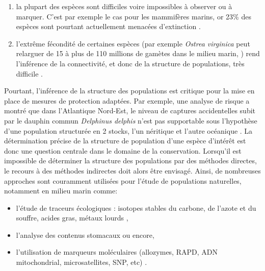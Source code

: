 \documentclass[a4paper,12pt,twoside]{article}\usepackage[]{graphicx}\usepackage[]{color}
\begin{document}
\begin {bibunit} [newbst]
\begin{enumerate}
	\item la plupart des espèces sont difficiles voire impossibles à observer ou à marquer. C'est par exemple le cas pour les mammifères marins, or 23\% des espèces sont pourtant actuellement menacées d'extinction \citep{schipper2008status}.
	\item l'extrême fécondité de certaines espèces (par exemple \emph{Ostrea virginica} peut relarguer de 15 à plus de 110 millions de gamètes dans le milieu marin, \citealp{galtsoff1930fecundity}) rend l'inférence de la connectivité, et donc de la structure de populations, très difficile \citep{gagnaire2015aa}.
\end{enumerate}

Pourtant, l'inférence de la structure des populations est critique pour la mise en place de mesures de protection adaptées. Par exemple, une analyse de risque a montré que dans l'Atlantique Nord-Est, le niveau de captures accidentelles subit par le dauphin commun \emph{Delphinus delphis} n'est pas supportable sous l'hypothèse d'une population structurée en 2 stocks, l'un néritique et l'autre océanique \citep{Mannocci2012}. La détermination précise de la structure de population d'une espèce d'intérêt est donc une question centrale dans le domaine de la conservation. Lorsqu'il est impossible de déterminer la structure des populations par des méthodes directes, le recours à des méthodes indirectes doit alors être envisagé. Ainsi, de nombreuses approches sont couramment utilisées pour l'étude de populations naturelles, notamment en milieu marin comme: 
\begin{itemize}
	\item l'étude de traceurs écologiques : isotopes stables du carbone, de l'azote et du souffre, acides gras, métaux lourds \citep{newman2000stock},
	\item l'analyse des contenus stomacaux \citep{spitz2006diet, spitz2011prey} ou encore,
	\item l'utilisation de marqueurs moléculaires (allozymes, RAPD, ADN mitochondrial, microsatellites, SNP, etc) \citep{pogson1995genetic, huang2000analysis}.
\end{itemize}


\end{bibunit}
\end{document}
